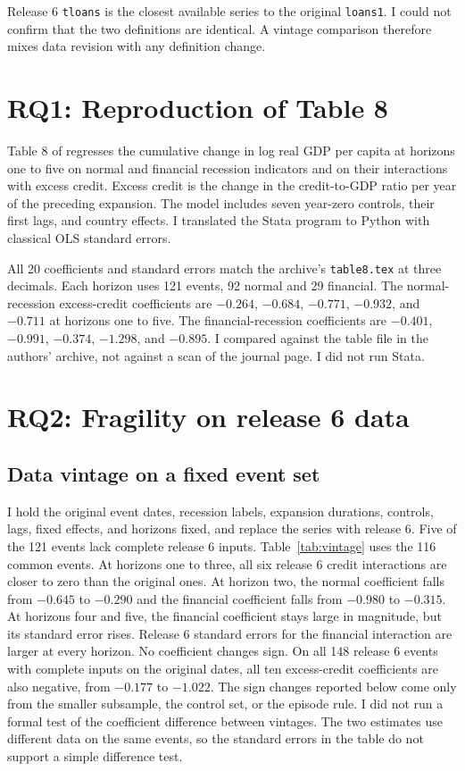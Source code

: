 \documentclass[11pt]{article}
\begin{document}
Release 6 \texttt{tloans} is the closest available series to the original \texttt{loans1}.
I could not confirm that the two definitions are identical. A vintage comparison therefore
mixes data revision with any definition change.

\section{RQ1: Reproduction of Table 8}
Table 8 of \citet{jst2013} regresses the cumulative change in log real GDP per capita at
horizons one to five on normal and financial recession indicators and on their interactions
with excess credit. Excess credit is the change in the credit-to-GDP ratio per year of the
preceding expansion. The model includes seven year-zero controls, their first lags, and
country effects. I translated the Stata program to Python with classical OLS standard errors.

All 20 coefficients and standard errors match the archive's \texttt{table8.tex} at three
decimals. Each horizon uses 121 events, 92 normal and 29 financial. The normal-recession
excess-credit coefficients are $-0.264$, $-0.684$, $-0.771$, $-0.932$, and $-0.711$ at
horizons one to five. The financial-recession coefficients are $-0.401$, $-0.991$,
$-0.374$, $-1.298$, and $-0.895$. I compared against the table file in the authors' archive,
not against a scan of the journal page. I did not run Stata.

\section{RQ2: Fragility on release 6 data}
\subsection{Data vintage on a fixed event set}
I hold the original event dates, recession labels, expansion durations, controls, lags,
fixed effects, and horizons fixed, and replace the series with release 6. Five of the 121
events lack complete release 6 inputs. Table~\ref{tab:vintage} uses the 116 common events.
At horizons one to three, all six release 6 credit interactions are closer to zero than the
original ones. At horizon two, the normal coefficient falls from $-0.645$ to $-0.290$ and the
financial coefficient falls from $-0.980$ to $-0.315$. At horizons four and five, the
financial coefficient stays large in magnitude, but its standard error rises. Release 6
standard errors for the financial interaction are larger at every horizon. No coefficient
changes sign. On all 148 release 6 events with complete inputs on the original dates, all
ten excess-credit coefficients are also negative, from $-0.177$ to $-1.022$. The sign
changes reported below come only from the smaller subsample, the control set, or the
episode rule. I did not run a formal test of the coefficient difference between vintages.
The two estimates use different data on the same events, so the standard errors in the
table do not support a simple difference test.
\end{document}

